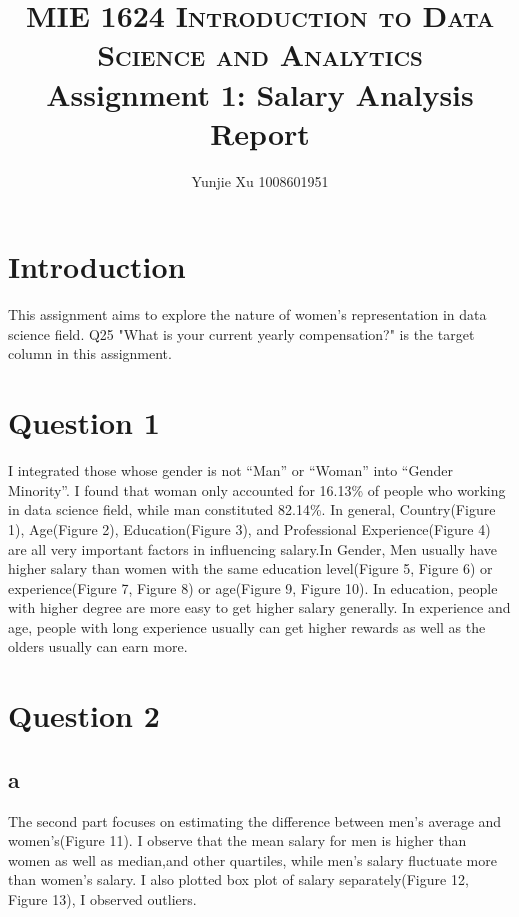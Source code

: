 \documentclass[10pt,onecolumn,letterpaper]{article}
\title{
		\usefont{OT1}{bch}{b}{n}
		\normalfont \normalsize \textsc{MIE 1624 Introduction to Data Science and Analytics} \\ [10pt]
		\huge Assignment 1: Salary Analysis Report \\
}
\author{Yunjie Xu 1008601951}
\affil{\small{Department of Mechanical and Industrial Engineering, University of Toronto}}
\begin{document}
\maketitle




\section*{Introduction}
This assignment aims to explore the nature of women's representation in data science field. Q25 "What is your current yearly compensation?" is the target column in this assignment.

\section*{Question 1}
I integrated those whose gender is not “Man” or “Woman” into “Gender Minority”. I found that woman only accounted for 16.13\% of people who working in data science field, while man constituted 82.14\%. In general,
Country(Figure 1), Age(Figure 2), Education(Figure 3), and Professional Experience(Figure 4) are all very important factors in influencing salary.In Gender, Men usually have higher salary than women with the same education level(Figure 5, Figure 6) or experience(Figure 7, Figure 8) or age(Figure 9, Figure 10). In education, people with higher degree are more easy to get higher salary generally. In experience and age, people with long experience usually can get higher rewards as well as the olders usually can earn more.

\section*{Question 2}
\subsection*{a}
The second part focuses on estimating the difference between men's average and women's(Figure 11). I observe that the mean salary for men is higher than women as well as median,and other quartiles, while men's salary fluctuate more than women's salary. I also plotted box plot of salary separately(Figure 12, Figure 13), I observed outliers.
\end{document}
